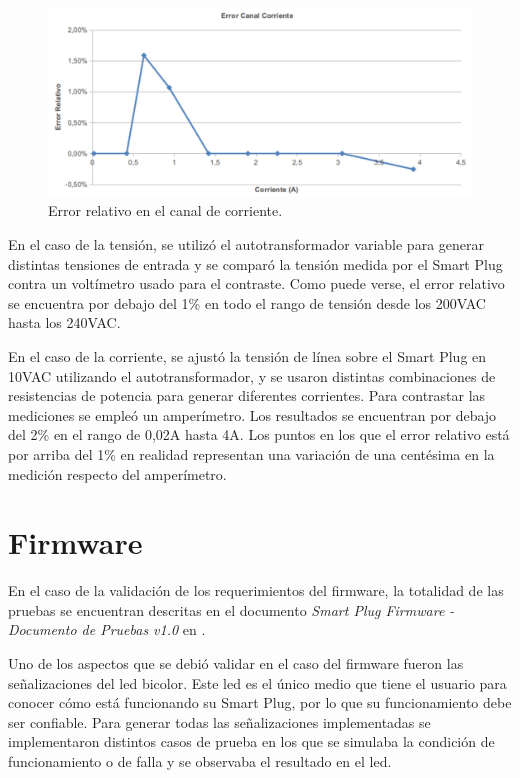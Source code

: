 \begin{figure}[h]
	\centering
	\includegraphics[width=12cm]{./Figures/4_1_1_error_canal_corriente.pdf}
	\caption{Error relativo en el canal de corriente.}
	\label{fig:error_canal_corriente}
\end{figure}

En el caso de la tensión, se utilizó el autotransformador variable para generar distintas tensiones de entrada y se comparó la tensión medida por el Smart Plug contra un voltímetro usado para el contraste. Como puede verse, el error relativo se encuentra por debajo del 1\% en todo el rango de tensión desde los 200VAC hasta los 240VAC.

En el caso de la corriente, se ajustó la tensión de línea sobre el Smart Plug en 10VAC utilizando el autotransformador, y se usaron distintas combinaciones de resistencias de potencia para generar diferentes corrientes. Para contrastar las mediciones se empleó un amperímetro. Los resultados se encuentran por debajo del 2\% en el rango de 0,02A hasta 4A. Los puntos en los que el error relativo está por arriba del 1\% en realidad representan una variación de una centésima en la medición respecto del amperímetro.



\section{Firmware}
\label{sec:validacion_firmware}

En el caso de la validación de los requerimientos del firmware, la totalidad de las pruebas se encuentran descritas en el documento \textit{Smart Plug Firmware - Documento de Pruebas v1.0} en \citep{repo_docu_firmware}.

Uno de los aspectos que se debió validar en el caso del firmware fueron las señalizaciones del led bicolor. Este led es el único medio que tiene el usuario para conocer cómo está funcionando su Smart Plug, por lo que su funcionamiento debe ser confiable. Para generar todas las señalizaciones implementadas se implementaron distintos casos de prueba en los que se simulaba la condición de funcionamiento o de falla y se observaba el resultado en el led.

